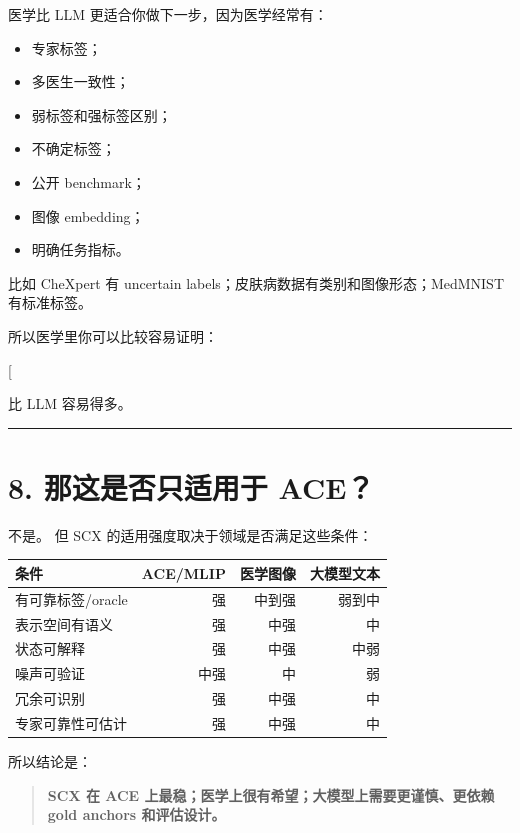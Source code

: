 \documentclass[
  12pt,
]{ctexart}
\providecommand{\tightlist}{%
  \setlength{\itemsep}{0pt}\setlength{\parskip}{0pt}}
\begin{document}
医学比 LLM 更适合你做下一步，因为医学经常有：

\begin{itemize}
\tightlist
\item
  专家标签；
\item
  多医生一致性；
\item
  弱标签和强标签区别；
\item
  不确定标签；
\item
  公开 benchmark；
\item
  图像 embedding；
\item
  明确任务指标。
\end{itemize}

比如 CheXpert 有 uncertain labels；皮肤病数据有类别和图像形态；MedMNIST
有标准标签。

所以医学里你可以比较容易证明：

{[}  \neq \text{noisy outlier}{]}

比 LLM 容易得多。

\begin{center}\rule{0.5\linewidth}{0.5pt}\end{center}

\section{8. 那这是否只适用于
ACE？}\label{ux90a3ux8fd9ux662fux5426ux53eaux9002ux7528ux4e8e-ace}

不是。 但 SCX 的适用强度取决于领域是否满足这些条件：

\begin{longtable}[]{@{}lrrr@{}}
\toprule\noalign{}
条件 & ACE/MLIP & 医学图像 & 大模型文本 \\
\midrule\noalign{}
\endhead
\bottomrule\noalign{}
\endlastfoot
有可靠标签/oracle & 强 & 中到强 & 弱到中 \\
表示空间有语义 & 强 & 中强 & 中 \\
状态可解释 & 强 & 中强 & 中弱 \\
噪声可验证 & 中强 & 中 & 弱 \\
冗余可识别 & 强 & 中强 & 中 \\
专家可靠性可估计 & 强 & 中强 & 中 \\
\end{longtable}

所以结论是：

\begin{quote}
\textbf{SCX 在 ACE 上最稳；医学上很有希望；大模型上需要更谨慎、更依赖
gold anchors 和评估设计。}
\end{quote}
\end{document}
